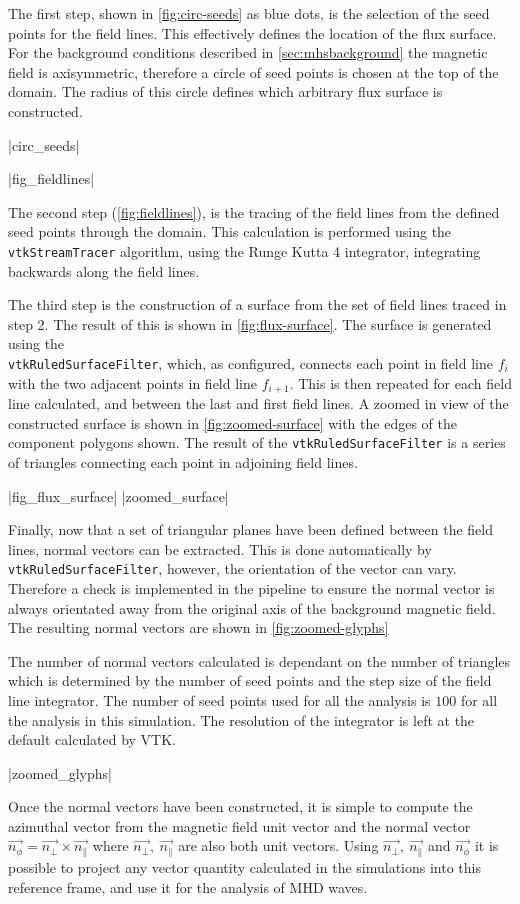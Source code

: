 The first step, shown in \cref{fig:circ-seeds} as blue dots, is the selection of the seed points for the field lines.
This effectively defines the location of the flux surface.
For the background conditions described in \cref{sec:mhsbackground} the magnetic field is axisymmetric, therefore a circle of seed points is chosen at the top of the domain.
The radius of this circle defines which arbitrary flux surface is constructed.

\py[chapter3a]|circ_seeds|

\py[chapter3a]|fig_fieldlines|

The second step (\cref{fig:fieldlines}), is the tracing of the field lines from the defined seed points through the domain.
This calculation is performed using the \verb|vtkStreamTracer| algorithm, using the Runge Kutta 4 integrator, integrating backwards along the field lines.


The third step is the construction of a surface from the set of field lines traced in step 2.
The result of this is shown in \cref{fig:flux-surface}.
The surface is generated using the \\ \verb|vtkRuledSurfaceFilter|, which, as configured, connects each point in field line $f_i$ with the two adjacent points in field line $f_{i+1}$.
This is then repeated for each field line calculated, and between the last and first field lines.
A zoomed in view of the constructed surface is shown in \cref{fig:zoomed-surface} with the edges of the component polygons shown.
The result of the \verb|vtkRuledSurfaceFilter| is a series of triangles connecting each point in adjoining field lines.


\py[chapter3a]|fig_flux_surface|
\py[chapter3a]|zoomed_surface|

Finally, now that a set of triangular planes have been defined between the field lines, normal vectors can be extracted.
This is done automatically by \verb|vtkRuledSurfaceFilter|, however, the orientation of the vector can vary.
Therefore a check is implemented in the pipeline to ensure the normal vector is always orientated away from the original axis of the background magnetic field.
The resulting normal vectors are shown in \cref{fig:zoomed-glyphs}

The number of normal vectors calculated is dependant on the number of triangles which is determined by the number of seed points and the step size of the field line integrator.
The number of seed points used for all the analysis is $100$ for all the analysis in this simulation.
The resolution of the integrator is left at the default calculated by VTK.

\py[chapter3a]|zoomed_glyphs|

Once the normal vectors have been constructed, it is simple to compute the azimuthal vector from the magnetic field unit vector and the normal vector $\vec{n_\phi}= \vec{n_\perp} \times \vec{n_\parallel}$ where $\vec{n_\perp},\ \vec{n_\parallel} $ are also both unit vectors. 
Using  $\vec{n_\perp},\ \vec{n_\parallel}$ and $\vec{n_\phi}$ it  is possible to project any vector quantity calculated in the simulations into this reference frame, and use it for the analysis of MHD waves.


